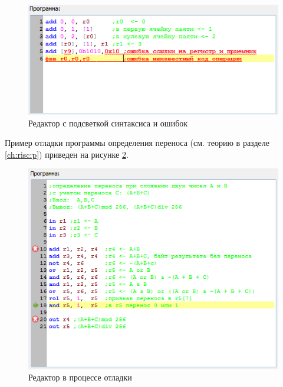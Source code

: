 \begin{figure}
    \centering
    \includegraphics{fig/syntaxhighlight}
    \caption{Редактор {\MyProc} с подсветкой синтаксиса и ошибок}\label{fig:asm:syntaxhighlight}
\end{figure}

Пример отладки программы определения переноса (см. теорию в разделе \ref{ch:risc:p}) приведен на рисунке \ref{fig:asm:r8asmEditor}.

\begin{figure}
    \centering
    \includegraphics{fig/r8asmEditor}
    \caption{Редактор {\MyProc} в процессе отладки}\label{fig:asm:r8asmEditor}
\end{figure}

%  
% 

